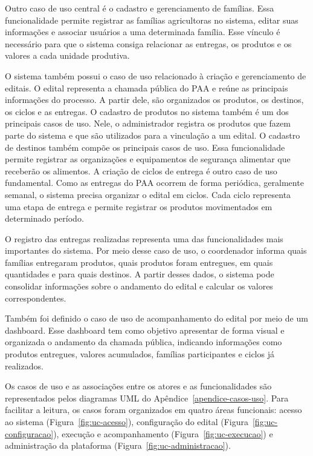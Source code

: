 Outro caso de uso central é o cadastro e gerenciamento de famílias. Essa funcionalidade permite registrar as famílias agricultoras no sistema, editar suas informações e associar usuários a uma determinada família. Esse vínculo é necessário para que o sistema consiga relacionar as entregas, os produtos e os valores a cada unidade produtiva.

O sistema também possui o caso de uso relacionado à criação e gerenciamento de editais. O edital representa a chamada pública do PAA e reúne as principais informações do processo. A partir dele, são organizados os produtos, os destinos, os ciclos e as entregas.
O cadastro de produtos no sistema também é um dos principais casos de uso. Nele, o administrador registra os produtos que fazem parte do sistema e que são utilizados para a vinculação a um edital.
O cadastro de destinos também compõe os principais casos de uso. Essa funcionalidade permite registrar as organizações e equipamentos de segurança alimentar que receberão os alimentos.
A criação de ciclos de entrega é outro caso de uso fundamental. Como as entregas do PAA ocorrem de forma periódica, geralmente semanal, o sistema precisa organizar o edital em ciclos. Cada ciclo representa uma etapa de entrega e permite registrar os produtos movimentados em determinado período.

O registro das entregas realizadas representa uma das funcionalidades mais importantes do sistema. Por meio desse caso de uso, o coordenador informa quais famílias entregaram produtos, quais produtos foram entregues, em quais quantidades e para quais destinos. A partir desses dados, o sistema pode consolidar informações sobre o andamento do edital e calcular os valores correspondentes.

Também foi definido o caso de uso de acompanhamento do edital por meio de um dashboard. Esse dashboard tem como objetivo apresentar de forma visual e organizada o andamento da chamada pública, indicando informações como produtos entregues, valores acumulados, famílias participantes e ciclos já realizados.

Os casos de uso e as associações entre os atores e as funcionalidades são representados pelos diagramas UML do Apêndice~\ref{apendice-casos-uso}. Para facilitar a leitura, os casos foram organizados em quatro áreas funcionais: acesso ao sistema (Figura~\ref{fig:uc-acesso}), configuração do edital (Figura~\ref{fig:uc-configuracao}), execução e acompanhamento (Figura~\ref{fig:uc-execucao}) e administração da plataforma (Figura~\ref{fig:uc-administracao}).

